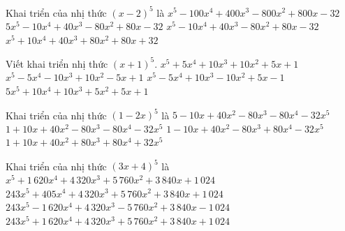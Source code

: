 \begin{ex}%
	Khai triển  của nhị thức $(x-2)^5$ là
	 \choice
		{$x^5-100 x^4+400 x^3-800  x^2+800 x-32$}
		{$5 x^5-10 x^4+40  x^3-80 x^2+80 x-32$}
		 {\True $x^5-10 x^4+40 x^3-80 x^2+80 x-32$}
		{$x^5+10 x^4+40 x^3+80 x^2+80  x+32$}
\end{ex}

\begin{ex}%
	Viết khai  triển nhị thức $(x+1)^5$.
	\choice 
		{\True $x^5 +5x^4 +10x^3  +10x^2 +5x +1$}
		{$x^5 -5x^4 -10x^3 +10x^2 -5x +1$} 
		{$x^5 -5x^4  +10x^3 -10x^2 +5x -1$}
		{$5x^5 +10x^4  +10x^3 +5x^2 +5x +1$}
\end{ex}

\begin{ex}%
	Khai triển của nhị thức $(1-2  x)^5$ là
	\choice 
		{$5-10 x+40 x^2-80 x^3-80 x^4-32  x^5$}
		{$1+10  x+40 x^2-80 x^3-80 x^4-32 x^5$}
		{\True $1-10 x+40 x^2-80 x^3+80 x^4-32  x^5$}
		{$1+10 x+40 x^2+80  x^3+80 x^4+32 x^5$}
\end{ex}

\begin{ex}%
	Khai triển của nhị thức  $(3 x+4)^5$ là
	 \choice
		{$x^5+1\,620 x^4+4\,320  x^3+5\,760 x^2+3\,840 x+1\,024$}
		{$243 x^5+405 x^4+4\,320 x^3+5\,760 x^2+3\,840 x+1\,024$} 
		{$243 x^5-1\,620 x^4+4\,320  x^3-5\,760 x^2+3\,840 x-1\,024$}
		 {\True $243 x^5+1\,620 x^4+4\,320 x^3+5\,760 x^2+3\,840 x+1\,024$}
\end{ex}

